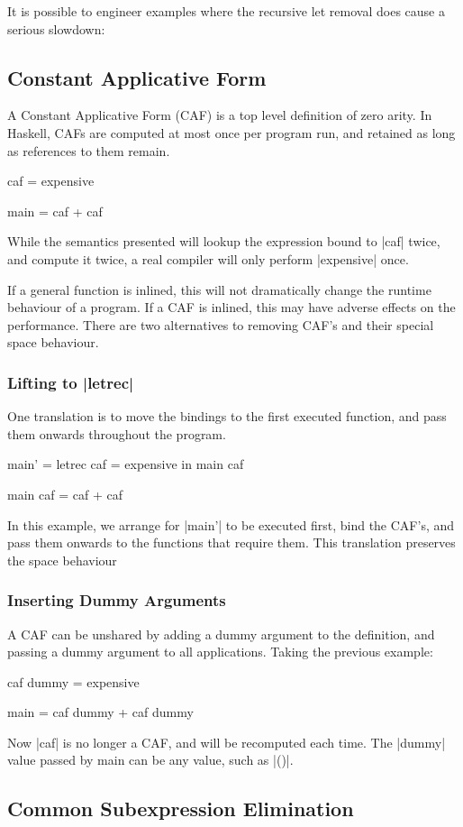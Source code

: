 It is possible to engineer examples where the recursive let removal does cause a serious slowdown:

\subsection{Constant Applicative Form}

A Constant Applicative Form (CAF) is a top level definition of zero arity. In Haskell, CAFs are computed at most once per program run, and retained as long as references to them remain.

\begin{example}
\begin{code}
caf = expensive

main = caf + caf
\end{code}

While the semantics presented will lookup the expression bound to |caf| twice, and compute it twice, a real compiler will only perform |expensive| once.
\end{example}

If a general function is inlined, this will not dramatically change the runtime behaviour of a program. If a CAF is inlined, this may have adverse effects on the performance. There are two alternatives to removing CAF's and their special space behaviour.

\subsubsection{Lifting to |letrec|}

One translation is to move the bindings to the first executed function, and pass them onwards throughout the program.

\begin{code}
main' =  letrec caf = expensive
         in main caf

main caf = caf + caf
\end{code}

In this example, we arrange for |main'| to be executed first, bind the CAF's, and pass them onwards to the functions that require them. This translation preserves the space behaviour

\subsubsection{Inserting Dummy Arguments}

A CAF can be unshared by adding a dummy argument to the definition, and passing a dummy argument to all applications. Taking the previous example:

\begin{code}
caf dummy = expensive

main = caf dummy + caf dummy
\end{code}

Now |caf| is no longer a CAF, and will be recomputed each time. The |dummy| value passed by main can be any value, such as |()|.



\subsection{Common Subexpression Elimination}

\cite{chitil:cse}

